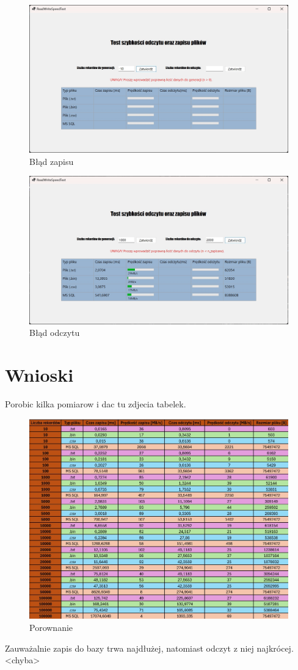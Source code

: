 \documentclass{report}
\begin{document}
\begin{figure}[h]
\centering
\includegraphics[width=15cm]{img/zapis_error.jpg}
\caption{Błąd zapisu}
\end{figure}

\begin{figure}[h]
\centering
\includegraphics[width=15cm]{img/odczyt_error.jpg}
\caption{Błąd odczytu}
\end{figure}

\section{Wnioski}
Porobic kilka pomiarow i dac tu zdjecia tabelek.

\begin{figure}[h]
\centering
\includegraphics[width=15cm]{img/tabela-porwn.jpg}
\caption{Porownanie}
\end{figure}

Zauważalnie zapis do bazy trwa najdłużej, natomiast odczyt z niej najkrócej. <chyba>
\end{document}
